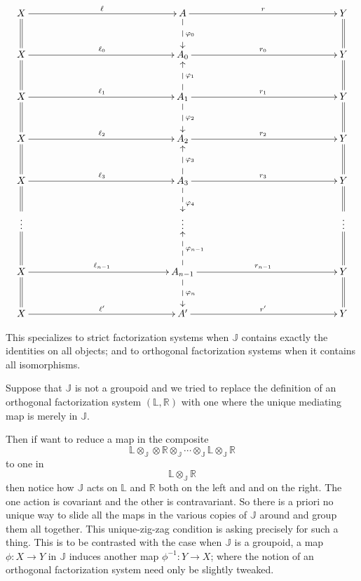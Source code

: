 \begin{definition}
$$
\xymatrixrowsep{10mm}
\xymatrixcolsep{50mm}
\xymatrix{
X   \ar[r]^{\ell}\ar@{=}[d]              & A \ar@{-->}[d]^{\phi_0} \ar[r]^{r}                                               & Y \ar@{=}[d]\\
X   \ar[r]^{\ell_0}\ar@{=}[d]          & A_0  \ar[r]^{r_0}                                                                          & Y\ar@{=}[d]\\
X   \ar[r]^{\ell_1}\ar@{=}[d]           & A_1 \ar@{-->}[u]_{\phi_1} \ar@{-->}[d]^{\phi_2} \ar[r]^{r_1}  & Y \ar@{=}[d]\\
X   \ar[r]^{\ell_2}\ar@{=}[d]           & A_2 \ar[r]^{r_2}                                                                             & Y \ar@{=}[d]\\
X   \ar[r]^{\ell_3}\ar@{=}[d]         & A_ 3\ar@{-->}[u]_{\phi_3} \ar@{-->}[d]^{\phi_4}\ar[r]^{r_3}   & Y \ar@{=}[d]\\
 \vdots\ar@{=}[d]         & \vdots & \vdots \ar@{=}[d] \\
X   \ar[r]^{\ell_{n-1}}\ar@{=}[d]   & A_{n-1}  \ar@{-->}[u]_{\phi_{n-1}} \ar@{-->}[d]^{\phi_n}  \ar[r]^{r_{n-1}}         & Y    \ar@{=}[d]\\
X   \ar[r]^{\ell'}                         & A'   \ar[r]^{r'} & Y
}
$$

\end{definition}
\endgroup

This specializes to strict factorization systems when $\mathbb J$ contains exactly the identities on all objects; and to orthogonal factorization systems when it contains all isomorphisms. 


Suppose that  $\mathbb J $ is not a groupoid and we tried to replace the definition of an orthogonal factorization system $(\mathbb L, \mathbb R)$ with one where the unique mediating map is merely in $\mathbb J$.


Then if want to reduce a map in the composite
$$\mathbb{L} \otimes_{\mathbb J} \otimes \mathbb{R} \otimes_{\mathbb J}  \cdots \otimes_{\mathbb J} \mathbb{L} \otimes_{\mathbb J} \mathbb R  $$
 to one in 
$$\mathbb{L} \otimes_{\mathbb J} \mathbb{R}$$
then notice how $\mathbb J$ acts on $\mathbb L$ and $\mathbb R$ both on the left and and on the right.  The one action is covariant and the other is contravariant.  So there is a priori no unique way to slide all the maps in the various copies of $\mathbb J$ around and group them all together.  This unique-zig-zag condition is asking precisely for such a thing.  This is to be contrasted with the case when $\mathbb J$ is a groupoid, a map $\phi:X\to Y$ in $\mathbb J$ induces another map $\phi^{-1}:Y\to X$; where the notion of an orthogonal factorization system need only be slightly tweaked.


